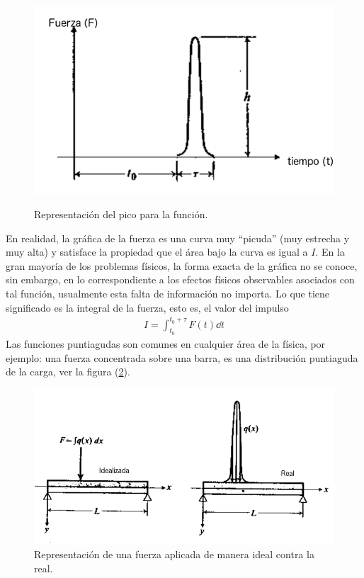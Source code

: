 \begin{figure}[H]
    \centering
    \includegraphics[scale=0.5]{Imagenes/delta_dirac_01.png}
    \label{fig_figura_delta_01}
    \caption{Representación del pico para la función.}
\end{figure}
En realidad, la gráfica de la fuerza es una curva muy \enquote{picuda} (muy estrecha y muy alta) y satisface la propiedad que el área bajo la curva es igual a $I$. En la gran mayoría de los problemas físicos, la forma exacta de la gráfica no se conoce, sin embargo, en lo correspondiente a los efectos físicos observables asociados con tal función, usualmente esta falta de información no importa. Lo que tiene significado es la integral de la fuerza, esto es, el valor del impulso
\begin{align*}
I = \int_{t_{0}}^{t_{0} + \tau } F(t) \dd{t}
\end{align*}
Las funciones puntiagudas son comunes en cualquier área de la física, por ejemplo: una fuerza concentrada sobre una barra, es una distribución puntiaguda de la carga, ver la figura (\ref{fig_figura_delta_02}). 
\begin{figure}[H]
    \centering
    \includegraphics[scale=0.5]{Imagenes/delta_dirac_02.png}
    \caption{Representación de una fuerza aplicada de manera ideal contra la real.}
    \label{fig_figura_delta_02}
\end{figure}
